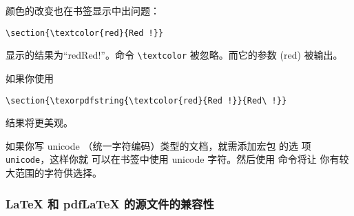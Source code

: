 
颜色的改变也在书签显示中出问题：
\begin{code}
\verb+\section{\textcolor{red}{Red !}}+
\end{code}
显示的结果为“redRed!”。命令 \verb+\textcolor+ 被忽略。而它的参数 (red) 被输出。


如果你使用
\begin{code}
\verb+\section{\texorpdfstring{\textcolor{red}{Red !}}{Red\ !}}+
\end{code}
结果将更美观。


如果你写 unicode （统一字符编码）类型的文档，就需添加宏包  的选
项 \verb+unicode+，这样你就
可以在书签中使用 unicode 字符。然后使用  命令将让
你有较大范围的字符供选择。

\subsubsection{\LaTeX{} 和 pdf\LaTeX{} 的源文件的兼容性}
\label{sec:pdfcompat}

